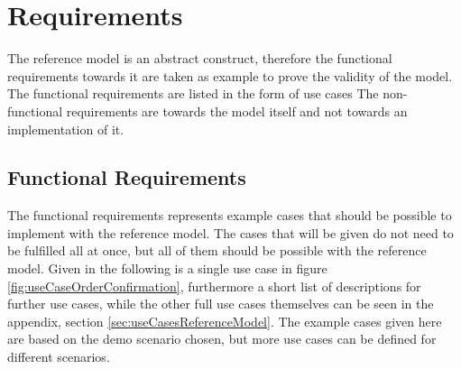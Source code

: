 \section{Requirements}
The reference model is an abstract construct, therefore the functional requirements towards it are taken as example to prove the validity of the model. The functional requirements are listed in the form of use cases The non-functional requirements are towards the model itself and not towards an implementation of it. 

\subsection{Functional Requirements}
The functional requirements represents example cases that should be possible to implement with the reference model. The cases that will be given do not need to be fulfilled all at once, but all of them should be possible with the reference model. Given in the following is a single use case in figure \ref{fig:useCaseOrderConfirmation}, furthermore a short list of descriptions for further use cases, while the other full use cases themselves can be seen in the appendix, section \ref{sec:useCasesReferenceModel}. The example cases given here are based on the demo scenario chosen, but more use cases can be defined for different scenarios.

